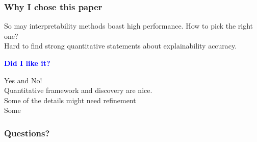 \documentclass{beamer}
\theoremstyle{mystyle}
\begin{document}
\begin{frame}
\frametitle{Why I chose this paper}\pause
So may interpretability methods boast high performance. How to pick the right one? 
\\
Hard to find strong quantitative statements about explainability accuracy. \pause

\vspace{0.3cm}

    \textcolor{blue}{\textbf{\Large Did I like it?}} \pause
   
    \vspace{0.3cm}

    Yes and No! \\ \pause
    Quantitative framework and discovery are nice. \\ \pause
    Some of the details might need refinement \\ \pause
    Some 
\end{frame}
\begin{frame}
	\frametitle{Questions?}
\end{frame}
\end{document}
